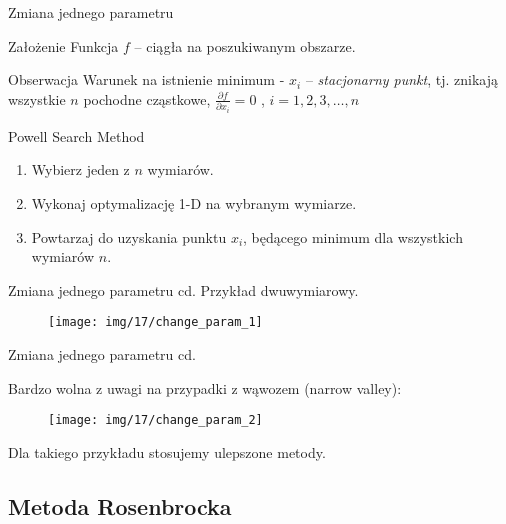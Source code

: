   \begin{frame}{Zmiana jednego parametru}
    \begin{block}{Założenie}
      Funkcja $f$ -- ciągła na poszukiwanym obszarze.
    \end{block}
    \begin{block}{Obserwacja}
        Warunek na istnienie minimum - $ x_i $ -- \emph{stacjonarny punkt},
        tj. znikają wszystkie $n$ pochodne cząstkowe, $ \frac{\partial f}{\partial x_i} = 0 $ , $ i = 1,2,3,\ldots ,n $
    \end{block}
    \begin{block}{Powell Search Method}
        \begin{enumerate}
          \item Wybierz jeden z $n$ wymiarów.
          \item Wykonaj optymalizację 1-D na wybranym wymiarze.
          \item Powtarzaj do uzyskania punktu $x_i$, będącego minimum dla wszystkich wymiarów $n$.
        \end{enumerate}
    \end{block}
  \end{frame}

  \begin{frame}{Zmiana jednego parametru cd.}
    Przykład dwuwymiarowy.
	\begin{figure}
		\centering
		\texttt{[image: img/17/change\_param\_1]}
	\end{figure}

  \end{frame}

  \begin{frame}{Zmiana jednego parametru cd.}

	Bardzo wolna z uwagi na przypadki z wąwozem (narrow valley):
	\begin{figure}
		\centering
		\texttt{[image: img/17/change\_param\_2]}
	\end{figure}
	Dla takiego przykładu stosujemy ulepszone metody.

  \end{frame}

\subsection{Metoda Rosenbrocka}

